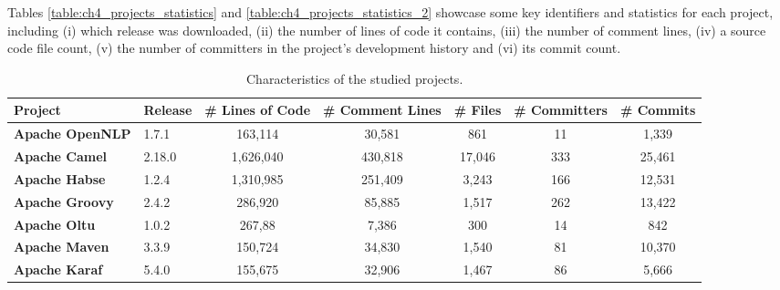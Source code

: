 Tables \ref{table:ch4_projects_statistics} and \ref{table:ch4_projects_statistics_2} showcase some key identifiers and statistics for each project, including (i) which release was downloaded, (ii) the number of lines of code it contains, (iii) the number of comment lines, (iv) a source code file count, (v) the number of committers in the project's development history and (vi) its commit count.

\begin{landscape}


\begin{table}[htbp]
	\small
	\centering
	\caption{Characteristics of the studied projects.}
	\begin{adjustbox}{width=1.3\textwidth}


		\begin{tabular}{l|l|c|c|c|c|c}
			\hline
			\textbf{Project}           & \textbf{Release} & \textbf{\# Lines of Code} & \textbf{\# Comment Lines} & \textbf{\# Files} & \textbf{\# Committers} & \textbf{\# Commits} \\ \hline
			\textbf{Apache OpenNLP}    & 1.7.1            &          163,114           &           30,581           &        861        &           11           &        1,339         \\ \hline
			\textbf{Apache Camel}      & 2.18.0           &          1,626,040          &          430,818           &       17,046       &          333           &        25,461        \\ \hline
			\textbf{Apache Habse}      & ‎1.2.4           &          1,310,985          &          251,409           &       3,243        &          166           &        12,531        \\ \hline
			\textbf{Apache Groovy}     & 2.4.2            &          286,920           &           85,885           &       1,517        &          262           &        13,422        \\ \hline
			\textbf{Apache Oltu}       & 1.0.2            &           267,88           &           7,386            &        300        &           14            &         842         \\ \hline
			\textbf{Apache Maven}      & 3.3.9            &          150,724           &           34,830           &       1,540        &           81           &        10,370        \\ \hline
			\textbf{Apache Karaf}      & 5.4.0            &          155,675           &           32,906           &       1,467        &           86           &        5,666         \\ \hline

\end{tabular}
\end{adjustbox}
\end{table}
\end{landscape}
